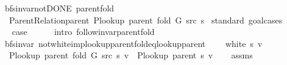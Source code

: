 \begin{isabellebody}
\begin{isamarkuptext}
\end{isamarkuptext}\isamarkuptrue%
\isamarkupfalse%
\ {\isacharparenleft}{\kern0pt}\ bfs{\isacharunderscore}{\kern0pt}invar{\isacharunderscore}{\kern0pt}not{\isacharunderscore}{\kern0pt}DONE{\isacharparenright}{\kern0pt}\ parent{\isacharunderscore}{\kern0pt}fold{\isacharcolon}{\kern0pt}\isanewline
\ \ \ {\isachardoublequoteopen}Parent{\isacharunderscore}{\kern0pt}Relation{\isachardot}{\kern0pt}parent\ {\isacharparenleft}{\kern0pt}P{\isacharunderscore}{\kern0pt}lookup\ {\isacharparenleft}{\kern0pt}parent\ {\isacharparenleft}{\kern0pt}fold\ G\ src\ s{\isacharparenright}{\kern0pt}{\isacharparenright}{\kern0pt}{\isacharparenright}{\kern0pt}{\isachardoublequoteclose}\isanewline
%
\isadelimproof
%
\endisadelimproof
%
\isatagproof
{}\isamarkupfalse%
\ {\isacharparenleft}{\kern0pt}standard{\isacharcomma}{\kern0pt}\ goal{\isacharunderscore}{\kern0pt}cases{\isacharparenright}{\kern0pt}\isanewline
\ \ \isamarkupfalse%
\ {}\isanewline
\ \ \isamarkupfalse%
\ {\isacharquery}{\kern0pt}case\isanewline
\ \ \ \ \isamarkupfalse%
\ {\isacharparenleft}{\kern0pt}intro\ follow{\isacharunderscore}{\kern0pt}invar{\isacharunderscore}{\kern0pt}parent{\isacharunderscore}{\kern0pt}fold{\isacharparenright}{\kern0pt}\isanewline
{}\isamarkupfalse%
%
\endisatagproof
{\isafoldproof}%
%
\isadelimproof
\isanewline
%
\endisadelimproof
\isanewline
{}\isamarkupfalse%
\ {\isacharparenleft}{\kern0pt}\ bfs{\isacharunderscore}{\kern0pt}invar{\isacharparenright}{\kern0pt}\ not{\isacharunderscore}{\kern0pt}white{\isacharunderscore}{\kern0pt}imp{\isacharunderscore}{\kern0pt}lookup{\isacharunderscore}{\kern0pt}parent{\isacharunderscore}{\kern0pt}fold{\isacharunderscore}{\kern0pt}eq{\isacharunderscore}{\kern0pt}lookup{\isacharunderscore}{\kern0pt}parent{\isacharcolon}{\kern0pt}\isanewline
\ \ \ {\isachardoublequoteopen}{\isasymnot}\ white\ s\ v{\isachardoublequoteclose}\isanewline
\ \ \ {\isachardoublequoteopen}P{\isacharunderscore}{\kern0pt}lookup\ {\isacharparenleft}{\kern0pt}parent\ {\isacharparenleft}{\kern0pt}fold\ G\ src\ s{\isacharparenright}{\kern0pt}{\isacharparenright}{\kern0pt}\ v\ {\isacharequal}{\kern0pt}\ P{\isacharunderscore}{\kern0pt}lookup\ {\isacharparenleft}{\kern0pt}parent\ s{\isacharparenright}{\kern0pt}\ v{\isachardoublequoteclose}\isanewline
%
\isadelimproof
\ \ %
\endisadelimproof
%
\isatagproof
{}\isamarkupfalse%
\ assms\isanewline

\end{isabellebody}
